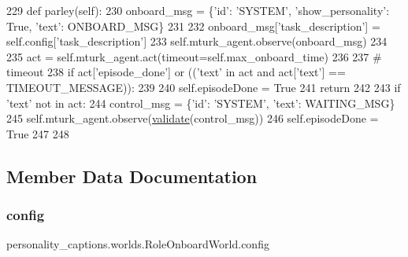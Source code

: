 \begin{DoxyCode}
229     \textcolor{keyword}{def }parley(self):
230         onboard\_msg = \{\textcolor{stringliteral}{'id'}: \textcolor{stringliteral}{'SYSTEM'}, \textcolor{stringliteral}{'show\_personality'}: \textcolor{keyword}{True}, \textcolor{stringliteral}{'text'}: ONBOARD\_MSG\}
231 
232         onboard\_msg[\textcolor{stringliteral}{'task\_description'}] = self.config[\textcolor{stringliteral}{'task\_description'}]
233         self.mturk\_agent.observe(onboard\_msg)
234 
235         act = self.mturk\_agent.act(timeout=self.max\_onboard\_time)
236 
237         \textcolor{comment}{# timeout}
238         \textcolor{keywordflow}{if} act[\textcolor{stringliteral}{'episode\_done'}] \textcolor{keywordflow}{or} ((\textcolor{stringliteral}{'text'} \textcolor{keywordflow}{in} act \textcolor{keywordflow}{and} act[\textcolor{stringliteral}{'text'}] == TIMEOUT\_MESSAGE)):
239 
240             self.episodeDone = \textcolor{keyword}{True}
241             \textcolor{keywordflow}{return}
242 
243         \textcolor{keywordflow}{if} \textcolor{stringliteral}{'text'} \textcolor{keywordflow}{not} \textcolor{keywordflow}{in} act:
244             control\_msg = \{\textcolor{stringliteral}{'id'}: \textcolor{stringliteral}{'SYSTEM'}, \textcolor{stringliteral}{'text'}: WAITING\_MSG\}
245             self.mturk\_agent.observe(\hyperlink{namespaceparlai_1_1core_1_1worlds_afc3fad603b7bce41dbdc9cdc04a9c794}{validate}(control\_msg))
246             self.episodeDone = \textcolor{keyword}{True}
247 
248 
\end{DoxyCode}


\subsection{Member Data Documentation}
\mbox{\label{classpersonality__captions_1_1worlds_1_1RoleOnboardWorld_ade4545af6ba49e704c8df5d223c330f0}} 
\subsubsection{\texorpdfstring{config}{config}}
{\footnotesize\ttfamily personality\+\_\+captions.\+worlds.\+Role\+Onboard\+World.\+config}



